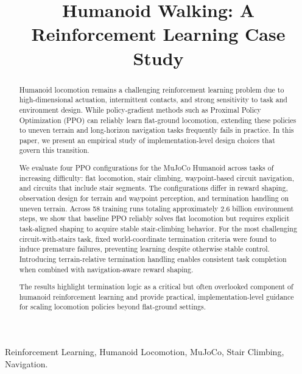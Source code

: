 \documentclass[conference]{IEEEtran}
\begin{document}
\title{Humanoid Walking: A Reinforcement Learning Case Study}

\author{
}

\maketitle

\begin{abstract}
Humanoid locomotion remains a challenging reinforcement learning problem due to high-dimensional actuation, intermittent contacts, and strong sensitivity to task and environment design.
While policy-gradient methods such as Proximal Policy Optimization (PPO) can reliably learn flat-ground locomotion, extending these policies to uneven terrain and long-horizon navigation tasks frequently fails in practice.
In this paper, we present an empirical study of implementation-level design choices that govern this transition.

We evaluate four PPO configurations for the MuJoCo Humanoid across tasks of increasing difficulty: flat locomotion, stair climbing, waypoint-based circuit navigation, and circuits that include stair segments.
The configurations differ in reward shaping, observation design for terrain and waypoint perception, and termination handling on uneven terrain.
Across 58 training runs totaling approximately 2.6 billion environment steps, we show that baseline PPO reliably solves flat locomotion but requires explicit task-aligned shaping to acquire stable stair-climbing behavior.
For the most challenging circuit-with-stairs task, fixed world-coordinate termination criteria were found to induce premature failures, preventing learning despite otherwise stable control.
Introducing terrain-relative termination handling enables consistent task completion when combined with navigation-aware reward shaping.

The results highlight termination logic as a critical but often overlooked component of humanoid reinforcement learning and provide practical, implementation-level guidance for scaling locomotion policies beyond flat-ground settings.
\end{abstract}

\begin{IEEEkeywords}
Reinforcement Learning, Humanoid Locomotion, MuJoCo, Stair Climbing, Navigation.
\end{IEEEkeywords}
\end{document}
